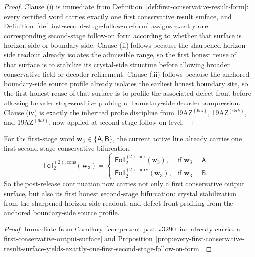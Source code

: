 \begin{proof}
Clause (i) is immediate from Definition~\ref{def:first-conservative-result-form}: every certified word carries exactly one first conservative result surface, and Definition~\ref{def:first-second-stage-follow-on-form} assigns exactly one corresponding second-stage follow-on form according to whether that surface is horizon-side or boundary-side. Clause (ii) follows because the sharpened horizon-side readout already isolates the admissible range, so the first honest reuse of that surface is to stabilize its crystal-side structure before allowing broader conservative field or decoder refinement. Clause (iii) follows because the anchored boundary-side source profile already isolates the earliest honest boundary site, so the first honest reuse of that surface is to profile the associated defect front before allowing broader stop-sensitive probing or boundary-side decoder compression. Clause (iv) is exactly the inherited probe discipline from 19AZ$^{(6ai)}$, 19AZ$^{(6ak)}$, and 19AZ$^{(6al)}$, now applied at second-stage follow-on level.
\end{proof}

\begin{corollary}
\label{cor:present-post-v3290-line-already-carries-a-first-second-stage-conservative-bifurcation}
For the first-stage word \(\mathbf w_3\in\{\mathsf A,\mathsf B\}\), the current active line already carries one first second-stage conservative bifurcation:
\[
  \mathsf{Foll}^{(2),\mathrm{cons}}_{2}(\mathbf w_3)
  =
  \begin{cases}
    \mathsf{Foll}^{(2),\mathrm{hor}}_{2}(\mathbf w_3), & \text{if }\mathbf w_3=\mathsf A,\\[2mm]
    \mathsf{Foll}^{(2),\mathrm{bdry}}_{2}(\mathbf w_3), & \text{if }\mathbf w_3=\mathsf B.
  \end{cases}
\]
So the post-release continuation now carries not only a first conservative output surface, but also its first honest second-stage bifurcation: crystal stabilization from the sharpened horizon-side readout, and defect-front profiling from the anchored boundary-side source profile.
\end{corollary}

\begin{proof}
Immediate from Corollary~\ref{cor:present-post-v3290-line-already-carries-a-first-conservative-output-surface} and Proposition~\ref{prop:every-first-conservative-result-surface-yields-exactly-one-first-second-stage-follow-on-form}.
\end{proof}

